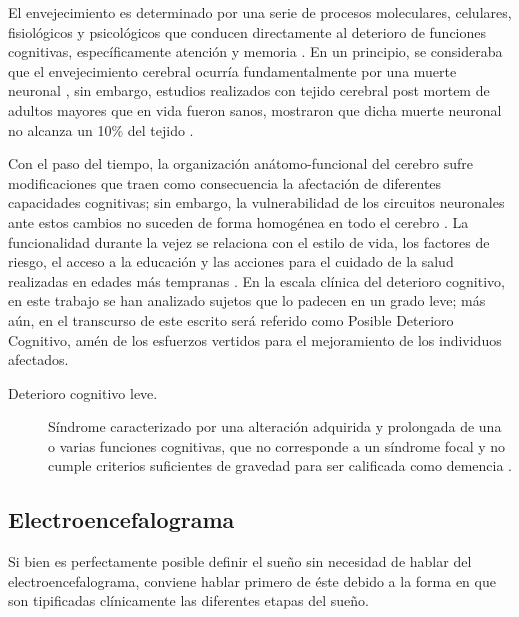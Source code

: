 \documentclass[12pt,a4paper]{mitthesis}
\begin{document}
El envejecimiento es determinado por una serie de procesos moleculares, celulares, fisiol\'ogicos y 
psicol\'ogicos que conducen directamente al deterioro de funciones cognitivas, específicamente 
atenci\'on y memoria \cite{Navarrete03,Park09}. 
En un principio, se consideraba que el envejecimiento cerebral ocurr\'ia fundamentalmente por una 
muerte neuronal \cite{Coleman87}, sin embargo, estudios realizados con tejido cerebral post mortem 
de adultos mayores que en vida fueron sanos, mostraron que dicha muerte neuronal no alcanza un 10\% 
del tejido \cite{Esiri07}. 

Con el paso del tiempo, la organizaci\'on an\'atomo-funcional del cerebro sufre modificaciones que 
traen como consecuencia la afectaci\'on de diferentes capacidades cognitivas; sin embargo, la 
vulnerabilidad de los circuitos neuronales ante estos cambios no suceden de forma homog\'enea en 
todo el cerebro \cite{Hita14}.
La funcionalidad durante la vejez se relaciona con el estilo de vida, los factores de riesgo, el 
acceso a la educaci\'on y las acciones para el cuidado de la salud realizadas en edades m\'as 
tempranas \cite{Ohayon04,Sanhueza14}.
En la escala cl\'inica del deterioro cognitivo, en este trabajo se han analizado sujetos que lo
padecen en un grado leve; m\'as a\'un, en el transcurso de este escrito ser\'a referido como 
Posible Deterioro Cognitivo, am\'en de los esfuerzos vertidos para el mejoramiento de los 
individuos afectados.

\begin{description}
\item[Deterioro cognitivo leve.] S\'indrome caracterizado por una alteraci\'on adquirida y 
prolongada de una o varias funciones cognitivas, que no corresponde a un s\'indrome focal y no 
cumple criterios suficientes de gravedad para ser calificada como demencia \cite{Robles02}.
\end{description}


\subsection{Electroencefalograma}

Si bien es perfectamente posible definir el sue\~no sin necesidad de hablar del 
electroencefalograma, conviene hablar primero de \'este debido a la forma en que son tipificadas
cl\'inicamente las diferentes etapas del sue\~no.
\end{document}

